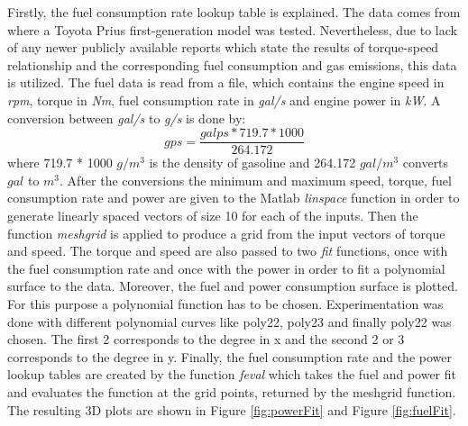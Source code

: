 Firstly, the fuel consumption rate lookup table is explained. The data comes from \citet{argonne1999} where a Toyota Prius first-generation model was tested. Nevertheless, due to lack of any newer publicly available reports which state the results of torque-speed relationship and the corresponding fuel consumption and gas emissions, this data is utilized. The fuel data is read from a file, which contains the engine speed in \textit{rpm}, torque in \textit{Nm}, fuel consumption rate in \textit{gal/s} and engine power in \textit{kW}.  A conversion between \textit{gal/s} to \textit{g/s} is done by:
\begin{equation}
gps = \frac{galps * 719.7 * 1000}{264.172}
\end{equation}
where 719.7 * 1000 $g/m^3$ is the density of gasoline and 264.172 $gal/m^3$ converts $gal$ to $m^3$. After the conversions the minimum and maximum speed, torque, fuel consumption rate and power are given to the Matlab \textit{linspace} function in order to generate linearly spaced vectors of size 10 for each of the inputs. Then the function \textit{meshgrid} is applied to produce a grid from the input vectors of torque and speed. The torque and speed are also passed to two \textit{fit} functions, once with the fuel consumption rate and once with the power in order to fit a polynomial surface to the data. Moreover, the fuel and power consumption surface is plotted. For this purpose a polynomial function has to be chosen. Experimentation was done with different polynomial curves like poly22, poly23 and finally poly22 was chosen. The first 2 corresponds to the degree in x and the second 2 or 3 corresponds to the degree in y. Finally, the fuel consumption rate and the power lookup tables are created by the function \textit{feval} which takes the fuel and power fit and evaluates the function at the grid points, returned by the meshgrid function. The resulting 3D plots are shown in Figure \ref{fig:powerFit} and Figure \ref{fig:fuelFit}.


